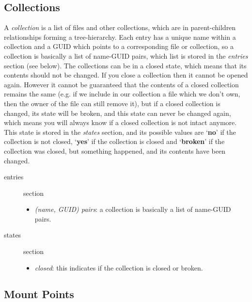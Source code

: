 \documentclass{book}
\begin{document}
\subsection{Collections} %
\label{sub:collections}

A \emph{collection} is a list of files and other collections, which are in parent-children relationships forming a tree-hierarchy. Each entry has a unique name within a collection and a GUID which points to a corresponding file or collection, so a collection is basically a list of name-GUID pairs, which list is stored in the \emph{entries} section (see below). The collections can be in a closed state, which means that its contents should not be changed. If you close a collection then it cannot be opened again. However it cannot be guaranteed that the contents of a closed collection remains the same (e.g. if we include in our collection a file which we don't own, then the owner of the file can still remove it), but if a closed collection is changed, its state will be broken, and this state can never be changed again, which means you will always know if a closed collection is not intact anymore. This state is stored in the \emph{states} section, and its possible values are `\textbf{no}' if the collection is not closed, `\textbf{yes}' if the collection is closed and `\textbf{broken}' if the collection was closed, but something happened, and its contents have been changed.

\begin{description}
    \item [entries] section 
    \begin{itemize}
        \item \emph{(name, GUID) pairs}: a collection is basically a list of name-GUID pairs. 
    \end{itemize}
    \item [states] section 
    \begin{itemize}
        \item \emph{closed}: this indicates if the collection is closed or broken. 
    \end{itemize}
\end{description}


\subsection{Mount Points} %
\label{sub:mount_points}
\end{document}
